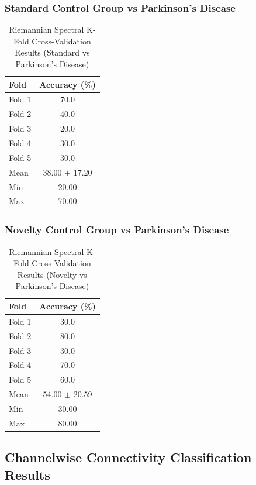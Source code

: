\documentclass[12pt]{report}
\begin{document}
\subsubsection{Standard Control Group vs Parkinson's Disease}

\begin{table}[h]
\centering
\caption{Riemannian Spectral K-Fold Cross-Validation Results (Standard vs Parkinson's Disease)}
\begin{tabular}{lc}
\hline
\textbf{Fold} & \textbf{Accuracy (\%)} \\
\hline
Fold 1 & 70.0 \\
Fold 2 & 40.0 \\
Fold 3 & 20.0 \\
Fold 4 & 30.0 \\
Fold 5 & 30.0 \\
\hline
Mean & 38.00 $\pm$ 17.20 \\
Min & 20.00 \\
Max & 70.00 \\
\hline
\end{tabular}
\end{table}

\subsubsection{Novelty Control Group vs Parkinson's Disease}

\begin{table}[h]
\centering
\caption{Riemannian Spectral K-Fold Cross-Validation Results (Novelty vs Parkinson's Disease)}
\begin{tabular}{lc}
\hline
\textbf{Fold} & \textbf{Accuracy (\%)} \\
\hline
Fold 1 & 30.0 \\
Fold 2 & 80.0 \\
Fold 3 & 30.0 \\
Fold 4 & 70.0 \\
Fold 5 & 60.0 \\
\hline
Mean & 54.00 $\pm$ 20.59 \\
Min & 30.00 \\
Max & 80.00 \\
\hline
\end{tabular}
\end{table}

\subsection{Channelwise Connectivity Classification Results}
\end{document}
